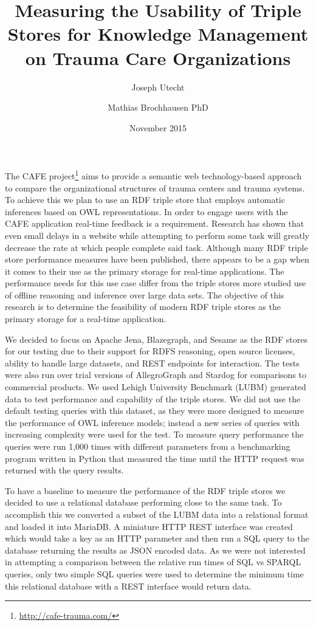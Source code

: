 \documentclass{llncs}
\title{Measuring the Usability of Triple Stores for Knowledge Management on Trauma Care Organizations}
\author{Joseph Utecht \and Mathias Brochhausen PhD}
\institute{Department of Biomedical Informatics, University of Arkansas for Medical Sciences, Little Rock, AR}
\date{November 2015}
\begin{document}
\maketitle

The CAFE project\footnote{\url{http://cafe-trauma.com/}} aims to provide a semantic web technology-based approach to compare the organizational structures of trauma centers and trauma systems.
To achieve this we plan to use an RDF triple store that employs automatic inferences based on OWL representations.
In order to engage users with the CAFE application real-time feedback is a requirement.
Research has shown that even small delays in a website while attempting to perform some task will greatly decrease the rate at which people complete said task\cite{Galletta2002}.
Although many RDF triple store performance measures have been published, there appears to be a gap when it comes to their use as the primary storage for real-time applications.
The performance needs for this use case differ from the triple stores more studied use of offline reasoning and inference over large data sets.
The objective of this research is to determine the feasibility of modern RDF triple stores as the primary storage for a real-time application.

We decided to focus on Apache Jena, Blazegraph, and Sesame as the RDF stores for our testing due to their support for RDFS reasoning, open source licenses, ability to handle large datasets, and REST endpoints for interaction.
The tests were also run over trial versions of AllegroGraph and Stardog for comparisons to commercial products.
We used Lehigh University Benchmark (LUBM)\cite{Guo2005} generated data to test performance and capability of the triple stores.
We did not use the default testing queries with this dataset, as they were more designed to measure the performance of OWL inference models; instead a new series of queries with increasing complexity were used for the test.
To measure query performance the queries were run 1,000 times with different parameters from a benchmarking program written in Python that measured the time until the HTTP request was returned with the query results.

To have a baseline to measure the performance of the RDF triple stores we decided to use a relational database performing close to the same task.
To accomplish this we converted a subset of the LUBM data into a relational format and loaded it into MariaDB.
A miniature HTTP REST interface was created which would take a key as an HTTP parameter and then run a SQL query to the database returning the results as JSON encoded data.
As we were not interested in attempting a comparison between the relative run times of SQL vs SPARQL queries, only two simple SQL queries were used to determine the minimum time this relational database with a REST interface would return data.
\end{document}
